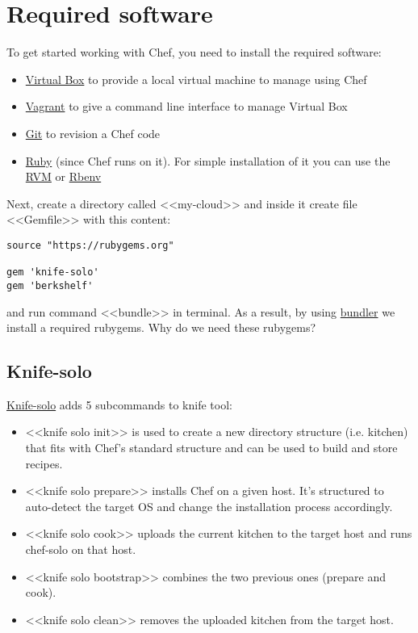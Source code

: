 \section{Required software}

To get started working with Chef, you need to install the required software:

\begin{itemize}
  \item \href{https://www.virtualbox.org/}{Virtual Box} to provide a local virtual machine to manage using Chef
  \item \href{http://www.vagrantup.com/}{Vagrant} to give a command line interface to manage Virtual Box
  \item \href{http://git-scm.com/}{Git} to revision a Chef code
  \item \href{https://www.ruby-lang.org}{Ruby} (since Chef runs on it). For simple installation of it you can use the \href{https://rvm.io/}{RVM} or \href{https://github.com/sstephenson/rbenv}{Rbenv}
\end{itemize}

Next, create a directory called <<my-cloud>> and inside it create file <<Gemfile>> with this content:

\begin{lstlisting}[label=lst:my-cloud-required1,title=my-cloud/Gemfile]
source "https://rubygems.org"

gem 'knife-solo'
gem 'berkshelf'
\end{lstlisting}

and run command <<bundle>> in terminal. As a result, by using \href{http://bundler.io/}{bundler} we install a required rubygems. Why do we need these rubygems?

\subsection{Knife-solo}

\href{http://matschaffer.github.io/knife-solo/}{Knife-solo} adds 5 subcommands to knife tool:

\begin{itemize}
  \item <<knife solo init>> is used to create a new directory structure (i.e. kitchen) that fits with Chef's standard structure and can be used to build and store recipes.
  \item <<knife solo prepare>> installs Chef on a given host. It's structured to auto-detect the target OS and change the installation process accordingly.
  \item <<knife solo cook>> uploads the current kitchen to the target host and runs chef-solo on that host.
  \item <<knife solo bootstrap>> combines the two previous ones (prepare and cook).
  \item <<knife solo clean>> removes the uploaded kitchen from the target host.
\end{itemize}

